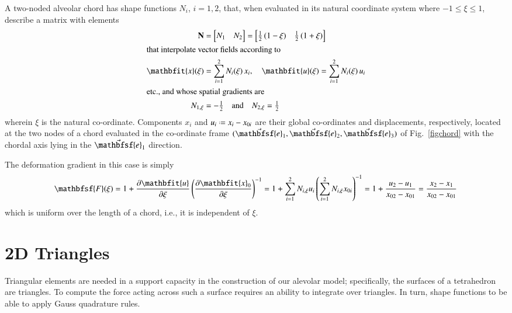A two-noded alveolar chord has shape functions $N_i$, $i=1,2$, that, when evaluated in its natural coordinate system where $-1 \leq \xi \leq 1$, describe a matrix with elements
\begin{subequations}
    \begin{align}
\mathbf{N} & = \begin{bmatrix} N_1 & N_2 \end{bmatrix} =
\begin{bmatrix}
\frac{1}{2} \, (1 - \xi) &  \frac{1}{2} \, (1 + \xi)
\end{bmatrix} \\
\intertext{that interpolate vector fields according to}
\mathbfit{x} ( \xi ) & = \sum_{i=1}^2 N_i ( \xi ) \, x_i , \quad
\mathbfit{u} ( \xi ) = \sum_{i=1}^2 N_i ( \xi ) \, u_i  \\
\intertext{etc., and whose spatial gradients are} 
N_{1,\xi} & = -\tfrac{1}{2} 
\quad \text{and} \quad
N_{2,\xi} = \tfrac{1}{2}
\end{align}
\end{subequations}
wherein $\xi$ is the natural co-ordinate.  Components $x_i$ and $u_i \defeq x_i - x_{0i}$ are their global co-ordinates and displacements, respectively, located at the two nodes of a chord evaluated in the co-ordinate frame $( \vec{\mathbfsf{e}}_1 , \vec{\mathbfsf{e}}_2 , \vec{\mathbfsf{e}}_3 )$ of Fig.~\ref{figchord} with the chordal axis lying in the $\vec{\mathbfsf{e}}_1$ direction.

The deformation gradient in this case is simply
\begin{equation}
    \mathbfsf{F} ( \xi ) = 1 + \frac{\partial \mathbfit{u}}{\partial \xi} 
    \left( \frac{\partial \mathbfit{x}_0 }{\partial \xi} \right)^{-1} = 
    1 + \sum_{i=1}^2 N_{i,\xi} u_i \left( \sum_{i=1}^2 N_{i,\xi} x_{0i} \right)^{-1} = 
    1 + \frac{u_2 - u_1}{x_{02} - x_{01}} = \frac{x_2 - x_1}{x_{02} - x_{01}}
\end{equation}
which is uniform over the length of a chord, i.e., it is independent of $\xi$.

\section{2D Triangles}

Triangular elements are needed in a support capacity in the construction of our alevolar model; specifically, the surfaces of a tetrahedron are triangles.  To compute the force acting across such a surface requires an ability to integrate over triangles.  In turn, shape functions to be able to apply Gauss quadrature rules. 

